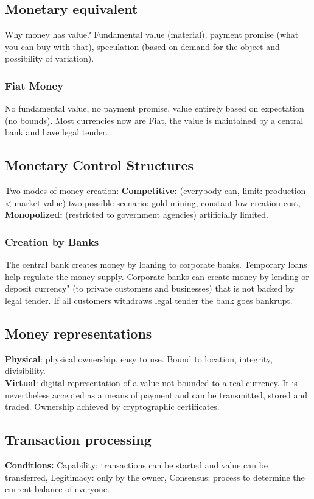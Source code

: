\documentclass{article}
\begin{document}
\subsection{Monetary equivalent}
Why money has value? Fundamental value (material), payment promise (what you can buy with that), speculation (based on demand for the object and possibility of variation).\\
\subsubsection{Fiat Money}
No fundamental value, no payment promise, value entirely based on expectation (no bounds). Most currencies now are Fiat, the value is maintained by a central bank and have legal tender.
\subsection{Monetary Control Structures}
Two modes of money creation: \textbf{Competitive: } (everybody can, limit: production < market value) two possible scenario: gold mining, constant low creation cost, \textbf{Monopolized: } (restricted to government agencies) artificially limited.
\subsubsection{Creation by Banks}
The central bank creates money by loaning to corporate banks. Temporary loans help regulate the money supply. Corporate banks can create money by lending or deposit currency" (to private customers and businesses) that is not backed by legal tender. If all customers withdraws legal tender the bank goes bankrupt.
\subsection{Money representations}
\textbf{Physical}: physical ownership, easy to use. Bound to location, integrity, divisibility.\\
\textbf{Virtual}: digital representation of a value not bounded to a real currency. It is nevertheless accepted as a means of payment and can be transmitted, stored and traded. Ownership achieved by cryptographic certificates.\subsection{Transaction processing}
\textbf{Conditions:} Capability: transactions can be started and value can be transferred, Legitimacy: only by the owner, Consensus: process to determine the current balance of everyone.
\newpage
\end{document}
